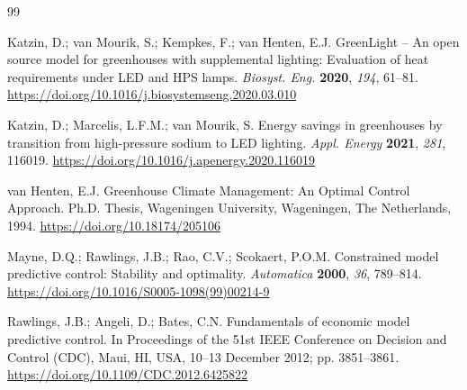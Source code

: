 \begin{thebibliography}{99}
\small

Katzin, D.; van Mourik, S.; Kempkes, F.; van Henten, E.J. GreenLight -- An open source
model for greenhouses with supplemental lighting: Evaluation of heat requirements under LED
and HPS lamps. \textit{Biosyst. Eng.} \textbf{2020}, \textit{194}, 61--81.
\url{https://doi.org/10.1016/j.biosystemseng.2020.03.010}

Katzin, D.; Marcelis, L.F.M.; van Mourik, S. Energy savings in greenhouses by transition
from high-pressure sodium to LED lighting. \textit{Appl. Energy} \textbf{2021},
\textit{281}, 116019. \url{https://doi.org/10.1016/j.apenergy.2020.116019}

van Henten, E.J. Greenhouse Climate Management: An Optimal Control Approach. Ph.D. Thesis,
Wageningen University, Wageningen, The Netherlands, 1994.
\url{https://doi.org/10.18174/205106}

Mayne, D.Q.; Rawlings, J.B.; Rao, C.V.; Scokaert, P.O.M. Constrained model predictive
control: Stability and optimality. \textit{Automatica} \textbf{2000}, \textit{36}, 789--814.
\url{https://doi.org/10.1016/S0005-1098(99)00214-9}

Rawlings, J.B.; Angeli, D.; Bates, C.N. Fundamentals of economic model predictive control.
In Proceedings of the 51st IEEE Conference on Decision and Control (CDC), Maui, HI, USA,
10--13 December 2012; pp. 3851--3861. \url{https://doi.org/10.1109/CDC.2012.6425822}


\end{thebibliography}
